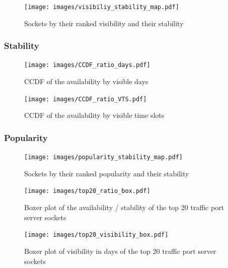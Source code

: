 \begin{figure}
	[ht] \centering 
	\texttt{[image: images/visibiliy\_stability\_map.pdf]}
	\caption{Sockets by their ranked visibility and their stability} 
	\label{fig:rankedVisibility} 
\end{figure}

\subsubsection{Stability}


\begin{landscape}
\begin{figure}
	[ht] \centering 
	\texttt{[image: images/CCDF\_ratio\_days.pdf]}
	\caption{CCDF of the availability by visible days} 
	\label{fig:ccdf_ratio_days} 
\end{figure}
\end{landscape}

\begin{landscape}
\begin{figure}
	[ht] \centering 
	\texttt{[image: images/CCDF\_ratio\_VTS.pdf]}
	\caption{CCDF of the availability by visible time slots} 
	\label{fig:ccdf_ratio_vts} 
\end{figure}
\end{landscape}

\subsubsection{Popularity}
\begin{figure}
	[ht] \centering 
	\texttt{[image: images/popularity\_stability\_map.pdf]}
	\caption{Sockets by their ranked popularity and their stability} 
	\label{fig:rankedPopularity} 
\end{figure}


\begin{landscape}
\begin{figure}
	[ht] \centering 
	\texttt{[image: images/top20\_ratio\_box.pdf]}
	\caption{Boxer plot of the availability / stability of the top 20 traffic port server sockets} 
	\label{fig:top20_ratio_box} 
\end{figure}
\end{landscape}

\begin{landscape}
\begin{figure}
	[ht] \centering 
	\texttt{[image: images/top20\_visibility\_box.pdf]}
	\caption{Boxer plot of visibility in days of the top 20 traffic port server sockets}
	\label{fig:top20_visibledays_box}
\end{figure}
\end{landscape}


